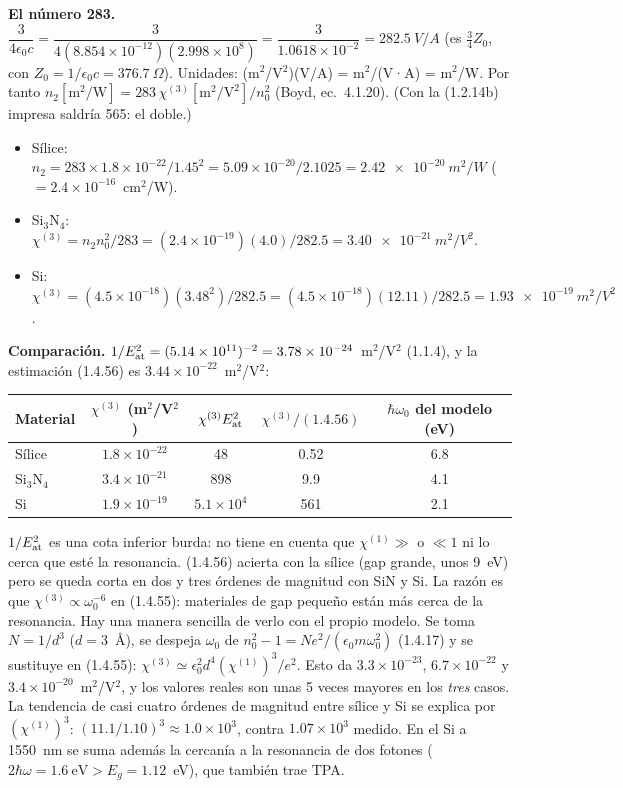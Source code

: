  \textbf{El número 283.} $\dfrac{3}{4\epsilon_0c}=\dfrac{3}{4(8.854\times10^{-12})(2.998\times10^{8})}=\dfrac{3}{1.0618\times10^{-2}}=\SI{282.5}{V/A}$
(es $\frac34Z_0$, con $Z_0=1/\epsilon_0c=376.7~\Omega$). Unidades: (m$^2$/V$^2$)(V/A) = m$^2$/(V·A) = m$^2$/W. Por tanto
$n_2[\mathrm{m^2/W}]=283\,\chi^{(3)}[\mathrm{m^2/V^2}]/n_0^2$ (Boyd, ec.~4.1.20). (Con la (1.2.14b) impresa saldría 565: el doble.)
\begin{itemize}
\item Sílice: $n_2=283\times1.8\times10^{-22}/1.45^2=5.09\times10^{-20}/2.1025=\SI{2.42e-20}{m^2/W}$ ($=2.4\times10^{-16}$~cm$^2$/W).
\item Si$_3$N$_4$: $\chi^{(3)}=n_2n_0^2/283=(2.4\times10^{-19})(4.0)/282.5=\SI{3.40e-21}{m^2/V^2}$.
\item Si: $\chi^{(3)}=(4.5\times10^{-18})(3.48^2)/282.5=(4.5\times10^{-18})(12.11)/282.5=\SI{1.93e-19}{m^2/V^2}$.
\end{itemize}
\textbf{Comparación.} $1/E_{\rm at}^2=(5.14\times10^{11})^{-2}=3.78\times10^{-24}$~m$^2$/V$^2$ (1.1.4), y la estimación (1.4.56) es $3.44\times10^{-22}$~m$^2$/V$^2$:
\begin{center}
\begin{tabular}{@{}lcccc@{}}\toprule
Material & $\chi^{(3)}$ (m$^2$/V$^2$) & $\chi^{(3)}E_{\rm at}^2$ & $\chi^{(3)}/(1.4.56)$ & $\hbar\omega_0$ del modelo (eV)\\\midrule
Sílice & $1.8\times10^{-22}$ & 48 & 0.52 & 6.8\\
Si$_3$N$_4$ & $3.4\times10^{-21}$ & 898 & 9.9 & 4.1\\
Si & $1.9\times10^{-19}$ & $5.1\times10^4$ & 561 & 2.1\\\bottomrule
\end{tabular}
\end{center}
$1/E_{\rm at}^2$ es una cota inferior burda: no tiene en cuenta que $\chi^{(1)}\gg$ o $\ll1$ ni lo cerca que esté la resonancia. (1.4.56) acierta con la sílice
(gap grande, unos 9~eV) pero se queda corta en dos y tres órdenes de magnitud con SiN y Si. La razón es que $\chi^{(3)}\propto\omega_0^{-6}$ en (1.4.55): materiales de
gap pequeño están más cerca de la resonancia. Hay una manera sencilla de verlo con el propio modelo. Se toma $N=1/d^3$ ($d=3$~Å), se despeja $\omega_0$ de
$n_0^2-1=Ne^2/(\epsilon_0m\omega_0^2)$ (1.4.17) y se sustituye en (1.4.55): $\chi^{(3)}\simeq\epsilon_0^2d^4(\chi^{(1)})^3/e^2$. Esto da
$3.3\times10^{-23}$, $6.7\times10^{-22}$ y $3.4\times10^{-20}$~m$^2$/V$^2$, y los valores reales son unas 5 veces mayores en los \emph{tres} casos. La tendencia de casi
cuatro órdenes de magnitud entre sílice y Si se explica por $(\chi^{(1)})^3$: $(11.1/1.10)^3\approx1.0\times10^3$, contra $1.07\times10^3$ medido. En el Si a 1550~nm se
suma además la cercanía a la resonancia de dos fotones ($2\hbar\omega=1.6~\mathrm{eV}>E_g=1.12$~eV), que también trae TPA.

